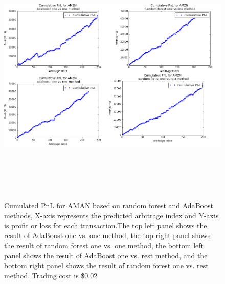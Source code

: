 \begin{figure} [hp]
  \begin{center}
    \includegraphics[width=6in,  height=5in]{figures/amzn_cum_pnl.png}
  \end{center}
\caption{Cumulated PnL for AMAN based on random forest and AdaBoost methods,    X-axis represents the predicted arbitrage index and Y-axis is profit or loss for each transaction.The top left panel shows the result of AdaBoost one vs. one method,   the top right panel shows the result of random forest one vs. one method,  the bottom left panel shows the result of AdaBoost one vs. rest method,   and the bottom right panel shows the result of random forest one vs. rest method. Trading cost is \$0.02} \label{fig:amzn_cum_pnl}
\end{figure}
